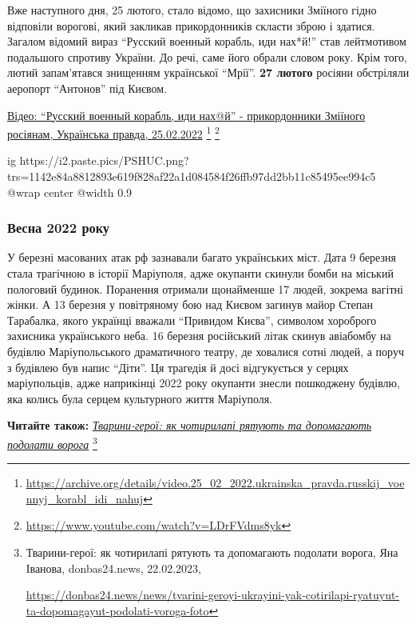 Вже наступного дня, 25 лютого, стало відомо, що захисники Зміїного гідно
відповіли ворогові, який закликав прикордонників скласти зброю і здатися.
Загалом відомий вираз \enquote{Русский военный корабль, иди нах*й!} став лейтмотивом
подальшого спротиву України. До речі, саме його обрали словом року. Крім того,
лютий запам'ятався знищенням української \enquote{Мрії}. \textbf{27 лютого} росіяни обстріляли
аеропорт \enquote{Антонов} під Києвом.

\href{https://archive.org/details/video.25_02_2022.ukrainska_pravda.russkij_voennyj_korabl_idi_nahuj}{%
Відео: \enquote{Русский военный корабль, иди нах@й} - прикордонники Зміїного росіянам, Українська правда, 25.02.2022}%
\footnote{\url{https://archive.org/details/video.25_02_2022.ukrainska_pravda.russkij_voennyj_korabl_idi_nahuj}} %
\footnote{\url{https://www.youtube.com/watch?v=LDrFVdms8yk}}

\ifcmt
  ig https://i2.paste.pics/PSHUC.png?trs=1142e84a8812893e619f828af22a1d084584f26ffb97dd2bb11c85495ee994c5
  @wrap center
  @width 0.9
\fi

\subsubsection{Весна 2022 року}

У березні масованих атак рф зазнавали багато українських міст. Дата 9 березня
стала трагічною в історії Маріуполя, адже окупанти скинули бомби на міський
пологовий будинок. Поранення отримали щонайменше 17 людей, зокрема вагітні
жінки. А 13 березня у повітряному бою над Києвом загинув майор Степан
Тарабалка, якого українці вважали \enquote{Привидом Києва}, символом хороброго
захисника українського неба. 16 березня російський літак скинув авіабомбу на
будівлю Маріупольського драматичного театру, де ховалися сотні людей, а поруч з
будівлею був напис \enquote{Діти}. Ця трагедія й досі відгукується у серцях
маріупольців, адже наприкінці 2022 року окупанти знесли пошкоджену будівлю, яка
колись була серцем культурного життя Маріуполя.

\textbf{Читайте також:} \href{https://donbas24.news/news/tvarini-geroyi-ukrayini-yak-cotirilapi-ryatuyut-ta-dopomagayut-podolati-voroga-foto}{\emph{Тварини-герої: як чотирилапі рятують та допомагають подолати ворога}}%
\footnote{Тварини-герої: як чотирилапі рятують та допомагають подолати ворога, Яна Іванова, donbas24.news, 22.02.2023, \par%
\url{https://donbas24.news/news/tvarini-geroyi-ukrayini-yak-cotirilapi-ryatuyut-ta-dopomagayut-podolati-voroga-foto}%
}

